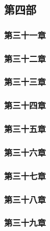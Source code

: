 \subsection{第四部}



\subsubsection{第三十一章}



\subsubsection{第三十二章}



\subsubsection{第三十三章}



\subsubsection{第三十四章}



\subsubsection{第三十五章}



\subsubsection{第三十六章}



\subsubsection{第三十七章}



\subsubsection{第三十八章}



\subsubsection{第三十九章}



